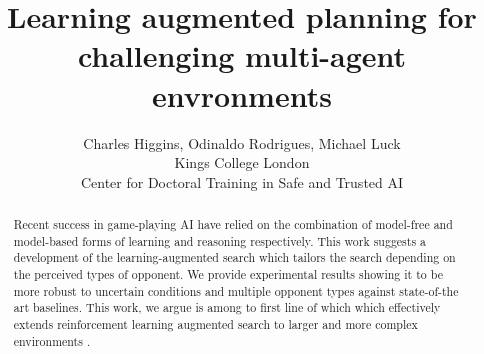 \documentclass[letterpaper]{article}
\begin{document}
%
\title{Learning augmented planning for challenging multi-agent envronments}
\author{Charles Higgins, Odinaldo Rodrigues,  Michael Luck\\
Kings College London\\
Center for Doctoral Training in Safe and Trusted AI
}
\maketitle
\begin{abstract}
Recent success in game-playing AI have relied on the combination of model-free and model-based forms of learning and reasoning respectively. This work suggests a development of the learning-augmented search which tailors the search depending on the perceived types of opponent. We provide experimental results showing it to be more robust to uncertain conditions and multiple opponent types against state-of-the art baselines. This work, we argue is among to first line of which which effectively extends reinforcement learning augmented search to larger and more complex environments
. 
\end{abstract}

  
  






  

\appendix

\end{document}

